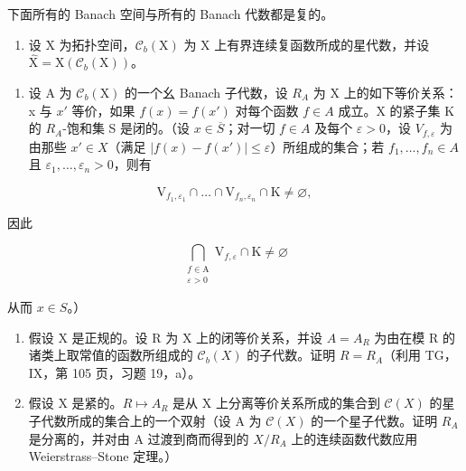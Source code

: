 
下面所有的 Banach 空间与所有的 Banach 代数都是复的。

\begin{enumerate}
\def\labelenumi{\arabic{enumi})}
\tightlist
\item
  设 X 为拓扑空间，\(\mathcal{C}_{b}(\mathrm{X})\) 为 X 上有界连续复函数所成的星代数，并设 \(\widehat{\mathrm{X}} = \mathrm{X}(\mathcal{C}_{b}(\mathrm{X}))\)。
\end{enumerate}

\begin{enumerate}
\def\labelenumi{\alph{enumi})}
\tightlist
\item
  设 A 为 \(\mathcal{C}_{b}(\mathrm{X})\) 的一个幺 Banach 子代数，设 \(R_{A}\) 为 X 上的如下等价关系：x 与 \(x'\) 等价，如果 \(f(x) = f(x')\) 对每个函数 \(f \in A\) 成立。X 的紧子集 K 的 \(R_{A}\)-饱和集 S 是闭的。（设 \(x \in \overline{S}\)；对一切 \(f \in A\) 及每个 \(\varepsilon > 0\)，设 \(V_{f,\varepsilon}\) 为由那些 \(x' \in X\)（满足 \(|f(x) - f(x')| \leqslant \varepsilon\)）所组成的集合；若 \(f_{1}, \ldots, f_{n} \in A\) 且 \(\varepsilon_{1}, \ldots, \varepsilon_{n} > 0\)，则有
\end{enumerate}

\[
\mathrm{V} _ {f _ {1}, \varepsilon_ {1}} \cap \dots \cap \mathrm{V} _ {f _ {n}, \varepsilon_ {n}} \cap \mathrm{K} \neq \varnothing ,
\]

因此

\[
\bigcap_{\substack{f\in \mathrm{A}\\ \varepsilon >0}}\mathrm{V}_{f,\varepsilon}\cap \mathrm{K}\neq \varnothing
\]

从而 \(x \in S\)。）

\begin{enumerate}
\def\labelenumi{\alph{enumi})}
\setcounter{enumi}{1}
\item
  假设 X 是正规的。设 R 为 X 上的闭等价关系，并设 \(A = A_{R}\) 为由在模 R 的诸类上取常值的函数所组成的 \(\mathcal{C}_{b}(X)\) 的子代数。证明 \(R = R_{A}\)（利用 TG，IX，第 105 页，习题 19，a）。
\item
  假设 X 是紧的。\(R \mapsto A_{R}\) 是从 X 上分离等价关系所成的集合到 \(\mathcal{C}(X)\) 的星子代数所成的集合上的一个双射（设 A 为 \(\mathcal{C}(X)\) 的一个星子代数。证明 \(R_{A}\) 是分离的，并对由 A 过渡到商而得到的 \(X/R_{A}\) 上的连续函数代数应用 Weierstrass–Stone 定理。）
\end{enumerate}

